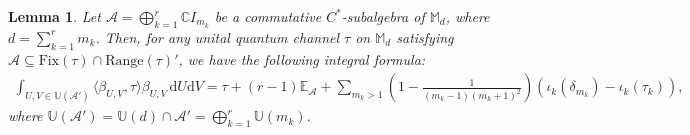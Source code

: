 \documentclass[11pt,reqno]{amsart}
\theoremstyle{definition}
\theoremstyle{plain}
\newtheorem{lem}[defn]{Lemma}
\theoremstyle{remark}
\numberwithin{equation}{section}%
\begin{document}
    
    
    \begin{lem}\label{EMD:lem4}
    	Let $\mathcal{A} = \bigoplus_{k=1}^r \mathbb{C}I_{m_k}$ be a commutative $C^*$-subalgebra of $\mathbb{M}_d$, where $d = \sum_{k=1}^r m_k$. Then, for any unital quantum channel $\tau$ on $\mathbb{M}_d$ satisfying $\mathcal{A} \subseteq \text{Fix}(\tau) \cap \text{Range}(\tau)'$, we have the following integral formula:
    	\small
    	\begin{align*}
    		\int_{U,V \in \mathbb{U}(\mathcal{A}')} \langle \beta_{U,V}, \tau \rangle \beta_{U,V} \, \mathrm{d}U\mathrm{d}V = \tau + (r-1)\mathbb{E}_{\mathcal{A}} + \sum_{m_k>1} \left( 1 - \frac{1}{(m_k-1)(m_k+1)^2} \right) (\iota_k(\delta_{m_k}) - \iota_k(\tau_k)),
    	\end{align*}
    	\normalsize
    	where $\mathbb{U}(\mathcal{A}') = \mathbb{U}(d) \cap \mathcal{A}' = \bigoplus_{k=1}^r \mathbb{U}(m_k)$.
    \end{lem}
    
\end{document}
